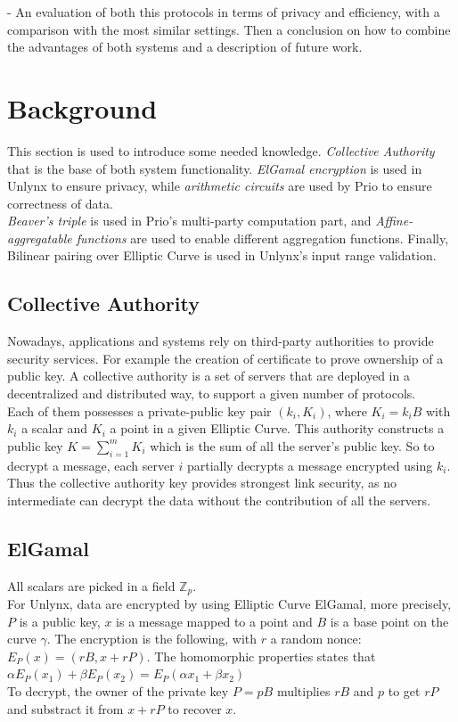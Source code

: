\documentclass{article}
\begin{document}
- An evaluation of both this protocols in terms of privacy and efficiency, with a comparison with the most similar settings. Then a conclusion on how to combine the advantages of both systems and a description of future work.


\section*{Background}
This section is used to introduce some needed knowledge. \textit{Collective Authority} that is the base of both system functionality. \textit{ElGamal encryption} is used in Unlynx to ensure privacy, while \textit{arithmetic circuits} are used by Prio to ensure correctness of data.\\
\textit{Beaver's triple} is used in Prio's multi-party computation part, and \textit{Affine-aggregatable functions} are used to enable different aggregation functions. 
Finally, Bilinear pairing over Elliptic Curve is used in Unlynx's input range validation.\\

\subsection*{Collective Authority}
Nowadays, applications and systems rely on third-party authorities to provide security services. For example the creation of certificate to prove ownership of a public key. A collective authority is a set of servers that are deployed in a decentralized and distributed way, to support a given number of protocols.\\
Each of them possesses a private-public key pair $(k_i,K_i)$, where $K_i = k_i B$ with $k_i$ a scalar and $K_i$ a point in a given Elliptic Curve. This authority constructs a public key $K = \sum_{i=1}^{m}{K_i}$ which is the sum of all the server's public key. So to decrypt a message, each server $i$ partially decrypts a message encrypted using $k_{i}$. Thus the collective authority key provides strongest link security, as no intermediate can decrypt the data without the contribution of all the servers.

\subsection*{ElGamal}
All scalars are picked in a field $\mathbb{Z}_p$.\\
For Unlynx, data are encrypted by using Elliptic Curve ElGamal, more precisely, $P$ is a public key, $x$ is a message mapped to a point and $B$ is a base point on the curve $\gamma$. The encryption is the following, with $r$ a random nonce:\\
$E_P(x) = (rB,x+rP)$. The homomorphic properties states that $\alpha E_P(x_1) + \beta E_P(x_2) = E_P(\alpha x_1+ \beta x_2)$\\
To decrypt, the owner of the private key $P = pB$ multiplies $rB$ and $p$ to get $rP$ and substract it from $x + rP$ to recover $x$.\\
\end{document}
